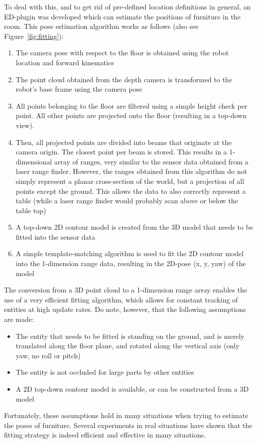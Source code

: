 To deal with this, and to get rid of pre-defined location definitions in general, an ED-plugin was developed which can estimate the positions of furniture in the room. This pose estimation algorithm works as follows (also see Figure~\ref{fig:fitting}):
\begin{enumerate}
    \item The camera pose with respect to the floor is obtained using the robot location and forward kinematics
    \item The point cloud obtained from the depth camera is transformed to the robot's base frame using the camera pose
    \item All points belonging to the floor are filtered using a simple height check per point. All other points are projected onto the floor (resulting in a top-down view).
    \item Then, all projected points are divided into beams that originate at the camera origin. The closest point per beam is stored. This results in a 1-dimensional array of ranges, very similar to the sensor data obtained from a laser range finder. However, the ranges obtained from this algorithm do not simply represent a planar cross-section of the world, but a projection of all points except the ground. This allows the data to also correctly represent a table (while a laser range finder would probably scan above or below the table top)
    \item A top-down 2D contour model is created from the 3D model that needs to be fitted into the sensor data
    \item A simple template-matching algorithm is used to fit the 2D contour model into the 1-dimension range data, resulting in the 2D-pose (x, y, yaw) of the model 
\end{enumerate}

The conversion from a 3D point cloud to a 1-dimension range array enables the use of a very efficient fitting algorithm, which allows for constant tracking of entities at high update rates. Do note, however, that the following assumptions are made:
\begin{itemize}
    \item The entity that needs to be fitted is standing on the ground, and is merely translated along the floor plane, and rotated along the vertical axis (only yaw, no roll or pitch)
    \item The entity is not occluded for large parts by other entities
    \item A 2D top-down contour model is available, or can be constructed from a 3D model
\end{itemize}

Fortunately, these assumptions hold in many situations when trying to estimate the poses of furniture. Several experiments in real situations have shown that the fitting strategy is indeed efficient and effective in many situations.